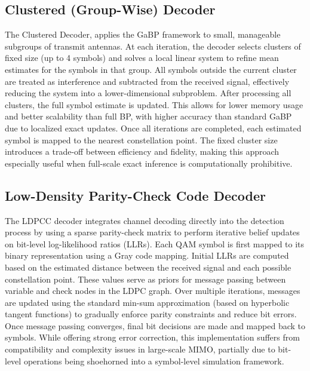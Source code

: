 \documentclass[conference]{IEEEtran}
\begin{document}
\subsection{Clustered (Group-Wise) Decoder}
The Clustered Decoder, applies the GaBP framework to small, manageable subgroups of transmit antennas. At each iteration, the decoder selects clusters of fixed size (up to 4 symbols) and solves a local linear system to refine mean estimates for the symbols in that group. All symbols outside the current cluster are treated as interference and subtracted from the received signal, effectively reducing the system into a lower-dimensional subproblem. After processing all clusters, the full symbol estimate is updated. This allows for lower memory usage and better scalability than full BP, with higher accuracy than standard GaBP due to localized exact updates. Once all iterations are completed, each estimated symbol is mapped to the nearest constellation point. The fixed cluster size introduces a trade-off between efficiency and fidelity, making this approach especially useful when full-scale exact inference is computationally prohibitive.

\subsection{Low-Density Parity-Check Code Decoder}
The LDPCC decoder integrates channel decoding directly into the detection process by using a sparse parity-check matrix to perform iterative belief updates on bit-level log-likelihood ratios (LLRs). Each QAM symbol is first mapped to its binary representation using a Gray code mapping. Initial LLRs are computed based on the estimated distance between the received signal and each possible constellation point. These values serve as priors for message passing between variable and check nodes in the LDPC graph. Over multiple iterations, messages are updated using the standard min-sum approximation (based on hyperbolic tangent functions) to gradually enforce parity constraints and reduce bit errors. Once message passing converges, final bit decisions are made and mapped back to symbols. While offering strong error correction, this implementation suffers from compatibility and complexity issues in large-scale MIMO, partially due to bit-level operations being shoehorned into a symbol-level simulation framework.
\end{document}

